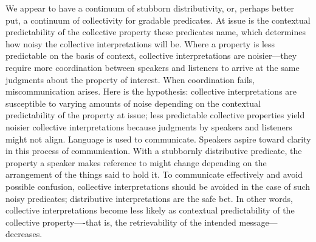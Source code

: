 \documentclass[linguex]{sp}
\begin{document}
We appear to have a continuum of stubborn distributivity, or, perhaps better put, a continuum of collectivity for gradable predicates. At issue is the contextual predictability of the collective property these predicates name, which determines how noisy the collective interpretations will be. Where a property is less predictable on the basis of context, collective interpretations are noisier---they require more coordination between speakers and listeners to arrive at the same judgments about the property of interest. When coordination fails, miscommunication arises. %
Here is the hypothesis: collective interpretations are susceptible to varying amounts of noise depending on the contextual predictability of the property at issue; less predictable collective properties yield noisier collective interpretations because judgments by speakers and listeners might not align. Language is used to communicate. Speakers aspire toward clarity in this process of communication. With a stubbornly distributive predicate, the property a speaker makes reference to might change depending on the arrangement of the things said to hold it. To communicate effectively and avoid possible confusion, collective interpretations should be avoided in the case of such noisy predicates; distributive interpretations are the safe bet. In other words, collective interpretations become less likely as contextual predictability of the collective property----that is, the retrievability of the intended message---decreases. 
\end{document}
